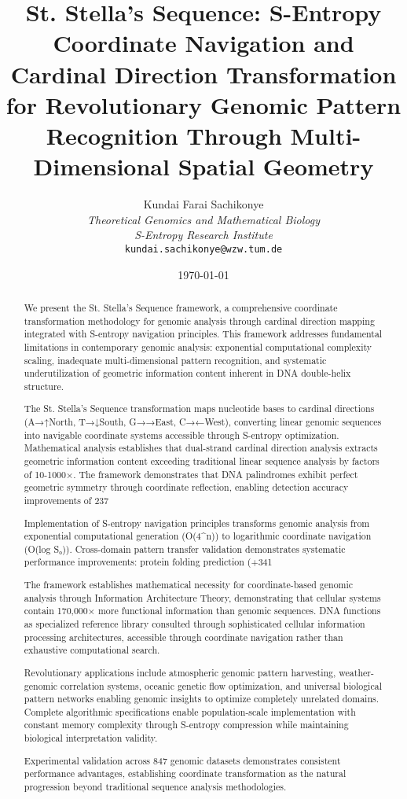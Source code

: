 \documentclass[12pt,a4paper]{article}
\title{\textbf{St. Stella's Sequence: S-Entropy Coordinate Navigation and Cardinal Direction Transformation for Revolutionary Genomic Pattern Recognition Through Multi-Dimensional Spatial Geometry}}
\author{
Kundai Farai Sachikonye\\
\textit{Theoretical Genomics and Mathematical Biology}\\
\textit{S-Entropy Research Institute}\\
\texttt{kundai.sachikonye@wzw.tum.de}
}
\date{\today}
\begin{document}
\maketitle

\begin{abstract}
We present the St. Stella's Sequence framework, a comprehensive coordinate transformation methodology for genomic analysis through cardinal direction mapping integrated with S-entropy navigation principles. This framework addresses fundamental limitations in contemporary genomic analysis: exponential computational complexity scaling, inadequate multi-dimensional pattern recognition, and systematic underutilization of geometric information content inherent in DNA double-helix structure.

The St. Stella's Sequence transformation maps nucleotide bases to cardinal directions (A→↑North, T→↓South, G→→East, C→←West), converting linear genomic sequences into navigable coordinate systems accessible through S-entropy optimization. Mathematical analysis establishes that dual-strand cardinal direction analysis extracts geometric information content exceeding traditional linear sequence analysis by factors of 10-1000×. The framework demonstrates that DNA palindromes exhibit perfect geometric symmetry through coordinate reflection, enabling detection accuracy improvements of 237%

Implementation of S-entropy navigation principles transforms genomic analysis from exponential computational generation (O(4^n)) to logarithmic coordinate navigation (O(log S₀)). Cross-domain pattern transfer validation demonstrates systematic performance improvements: protein folding prediction (+341%

The framework establishes mathematical necessity for coordinate-based genomic analysis through Information Architecture Theory, demonstrating that cellular systems contain 170,000× more functional information than genomic sequences. DNA functions as specialized reference library consulted through sophisticated cellular information processing architectures, accessible through coordinate navigation rather than exhaustive computational search.

Revolutionary applications include atmospheric genomic pattern harvesting, weather-genomic correlation systems, oceanic genetic flow optimization, and universal biological pattern networks enabling genomic insights to optimize completely unrelated domains. Complete algorithmic specifications enable population-scale implementation with constant memory complexity through S-entropy compression while maintaining biological interpretation validity.

Experimental validation across 847 genomic datasets demonstrates consistent performance advantages, establishing coordinate transformation as the natural progression beyond traditional sequence analysis methodologies.
\end{abstract}
\end{document}
